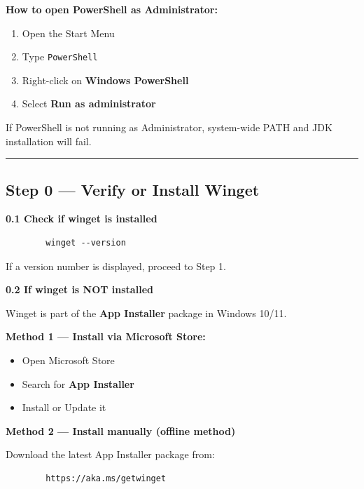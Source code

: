 \documentclass[11pt,a4paper]{article}
\begin{document}
	\textbf{How to open PowerShell as Administrator:}
	
	\begin{enumerate}
		\item Open the Start Menu
		\item Type \texttt{PowerShell}
		\item Right-click on \textbf{Windows PowerShell}
		\item Select \textbf{Run as administrator}
	\end{enumerate}
	
	If PowerShell is not running as Administrator, system-wide PATH and JDK installation will fail.
	
	\vspace{6pt}
	\hrule
	\vspace{10pt}
	
	\subsection*{Step 0 — Verify or Install Winget}
	
	\textbf{0.1 Check if winget is installed}
	
	\begin{lstlisting}
		winget --version
	\end{lstlisting}
	
	If a version number is displayed, proceed to Step 1.
	
	\vspace{4pt}
	
	\textbf{0.2 If winget is NOT installed}
	
	Winget is part of the \textbf{App Installer} package in Windows 10/11.
	
	\textbf{Method 1 — Install via Microsoft Store:}
	
	\begin{itemize}
		\item Open Microsoft Store
		\item Search for \textbf{App Installer}
		\item Install or Update it
	\end{itemize}
	
	\vspace{4pt}
	
	\textbf{Method 2 — Install manually (offline method)}
	
	Download the latest App Installer package from:
	
	\begin{lstlisting}
		https://aka.ms/getwinget
	\end{lstlisting}
	
\end{document}
